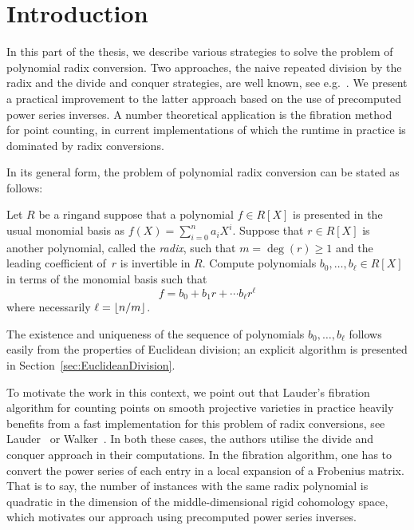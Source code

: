 
\chapter{Introduction}
\label{ch:02-Intro}

In this part of the thesis, we describe various strategies to solve the 
problem of polynomial radix conversion.  Two approaches, the naive 
repeated division by the radix and the divide and conquer strategies, are 
well known, see e.g.~\citep[\S 9.2]{GathenGerhard2003}.  We present a 
practical improvement to the latter approach based on the use of 
precomputed power series inverses.  A number theoretical application is 
the fibration method for point counting, in current implementations of 
which the runtime in practice is dominated by radix conversions.

In its general form, the problem of polynomial radix conversion 
can be stated as follows:

\begin{prob} \label{prob:exact}
Let $R$ be a ring\footnotemark and suppose that a polynomial $f \in R[X]$ is 
presented in the usual monomial basis as $f(X) = \sum_{i=0}^{n} a_i X^i$.
Suppose that $r \in R[X]$ is another polynomial, called the \emph{radix}, 
such that $m = \deg(r) \geq 1$ and the leading coefficient of~$r$ is invertible 
in $R$.  Compute polynomials $b_0, \dotsc, b_{\ell} \in R[X]$ in terms of 
the monomial basis such that 
\begin{equation*}
f = b_0 + b_1 r + \dotsb b_{\ell} r^{\ell}
\end{equation*}
where necessarily $\ell = \left\lfloor n / m\right\rfloor$.
\end{prob}


The existence and uniqueness of the sequence of polynomials $b_0, \dotsc, b_{\ell}$ 
follows easily from the properties of Euclidean division;  an explicit algorithm is 
presented in Section~\ref{sec:EuclideanDivision}.

To motivate the work in this context, we point out that Lauder's 
fibration algorithm for counting points on smooth projective varieties 
in practice heavily benefits from a fast implementation for this problem 
of radix conversions, see Lauder~\citep[\S 6.5.2]{Lauder2006} or 
Walker~\citep[\S 3.2.2]{Walker2009}.  In both these cases, the authors 
utilise the divide and conquer approach in their computations.  In the 
fibration algorithm, one has to convert the power series of each 
entry in a local expansion of a Frobenius matrix.  That is to say, 
the number of instances with the same radix polynomial is quadratic 
in the dimension of the middle-dimensional rigid cohomology space, 
which motivates our approach using precomputed power series inverses.

